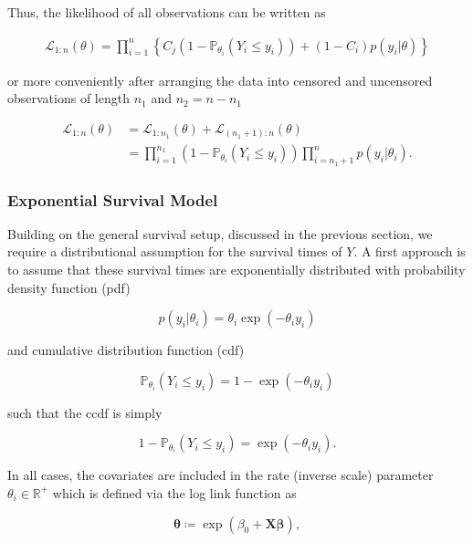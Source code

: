 \documentclass[11pt]{article}
\begin{document}
Thus, the likelihood of all observations can be written as 

\begin{align*}
    \mathcal{L}_{1:n}(\theta) = \prod_{i = 1}^n \left\{C_j (1-\mathbb{P}_{\theta_i}(Y_i \leq y_i)) + (1-C_i) p(y_i|\theta)\right\}
\end{align*}

or more conveniently after arranging the data into censored and uncensored observations of length $n_1$ and $n_2 = n - n_1$ 

\begin{align}
    \mathcal{L}_{1:n}(\theta) &= \mathcal{L}_{1:n_1}(\theta) + \mathcal{L}_{(n_1 + 1):n}(\theta) \nonumber \\
    &= \prod_{i = 1}^{n_1} (1-\mathbb{P}_{\theta_i}(Y_i \leq y_i)) \prod_{i = n_1 + 1}^n p(y_i|\theta_i).
    \label{eq:likelihood}
\end{align}

\subsubsection{Exponential Survival Model}
Building on the general survival setup, discussed in the previous section, we require a distributional assumption for the survival times of $Y$. A first approach is to assume that these survival times are exponentially distributed with probability density function (pdf)

\begin{equation*}
    p(y_i|\theta_i) = \theta_i \exp(-\theta_i y_i)
\end{equation*}

and cumulative distribution function (cdf) 

\begin{equation*}
    \mathbb{P}_{\theta_i}(Y_i \leq y_i) = 1 - \exp(-\theta_i y_i)
\end{equation*}

such that the ccdf is simply
    
\begin{equation*}
    1 - \mathbb{P}_{\theta_i}(Y_i \leq y_i) = \exp(-\theta_i y_i).
\end{equation*}
    
In all cases, the covariates are included in the rate (inverse scale) parameter $\theta_i \in \mathbb{R}^+$ which is defined via the log link function as 

\begin{equation*}
    \bm{\theta} \coloneqq \exp(\beta_0 + \bm{X}\bm{\beta}),
\end{equation*}
\end{document}
